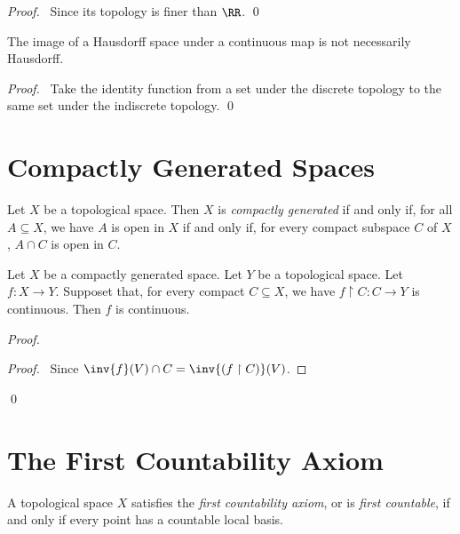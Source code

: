 \begin{proof}
    \pf\ Since its topology is finer than $\RR$. \qed
\end{proof}

\begin{proposition}
    The image of a Hausdorff space under a continuous map is
    not necessarily Hausdorff.
\end{proposition}

\begin{proof}
    \pf\ Take the identity function from a set under the
    discrete topology to the same set under the indiscrete topology. \qed
\end{proof}

\section{Compactly Generated Spaces}

\begin{definition}
    Let $X$ be a topological space. Then $X$ is \emph{compactly generated} if and only if, for all $A \subseteq X$,
    we have $A$ is open in $X$ if and only if, for every compact subspace $C$ of $X$, $A \cap C$ is open in $C$.
\end{definition}

\begin{lemma}
    \label{lemma:compactly_generated_continuous}
    Let $X$ be a compactly generated space. Let $Y$ be a topological space. Let $f : X \rightarrow Y$. Supposet that,
    for every compact $C \subseteq X$, we have $f \restriction C : C \rightarrow Y$ is continuous. Then $f$ is continuous.
\end{lemma}

\begin{proof}
    \pf
    \begin{proof}
        \pf\ Since $\inv{f}(V) \cap C = \inv{(f \restriction C)}(V)$.
    \end{proof}
    \qed
\end{proof}
\section{The First Countability Axiom}

\begin{definition}
    A topological space $X$ satisfies the \emph{first countability axiom}, or is \emph{first countable}, if and only if every point has a countable local basis.
\end{definition}


